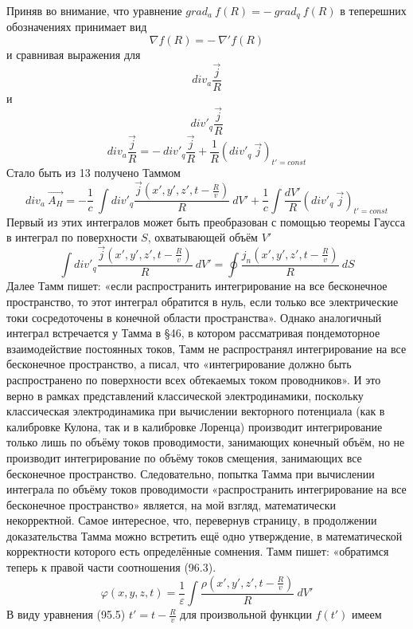 \documentclass[11pt]{article}
\begin{document}
Приняв во внимание, что уравнение
\(gra{{d}_{a}}\ f\left( R \right)=-\ gra{{d}_{q}}\ f\left( R \right)\) в
теперешних обозначениях принимает вид
\[\nabla f\left( R \right)=-\ \nabla 'f\left( R \right)\] и сравнивая
выражения для \[di{{v}_{a}}\frac{\overrightarrow{j}}{R}\] и
\[div{{'}_{q}}\frac{\overrightarrow{j}}{R}\]
\[{{div}_{a}}\frac{\overrightarrow{j}}{R}=-\ div{{'}_{q}}\frac{\overrightarrow{j}}{R}+\frac{1}{R}{{\left( div{{'}_{q}}\ \overrightarrow{j} \right)}_{t'=const}}\]
Стало быть из 13 получено Таммом
\[{{div}_{a}}\ \overrightarrow{{{A}_{H}}}=-\frac{1}{c}\ \int{div{{'}_{q}}\frac{\overrightarrow{j}\left( x',y',z',t-\frac{R}{v} \right)}{R}}\ dV'+\frac{1}{c}\int{\frac{dV'}{R}}{{\left( div{{'}_{q}}\ \overrightarrow{j} \right)}_{t'=const}}\]
Первый из этих интегралов может быть преобразован с помощью теоремы
Гаусса в интеграл по поверхности \(S\), охватывающей объём \(V'\)
\[\int{div{{'}_{q}}\frac{\overrightarrow{j}\left( x',y',z',t-\frac{R}{v} \right)}{R}}\ dV'=\oint{\frac{{{j}_{n}}\left( x',y',z',t-\frac{R}{v} \right)}{R}}\ dS\]
Далее Тамм пишет: «если распространить интегрирование на все бесконечное
пространство, то этот интеграл обратится в нуль, если только все
электрические токи сосредоточены в конечной области пространства».
Однако аналогичный интеграл встречается у Тамма в §46, в котором
рассматривая пондемоторное взаимодействие постоянных токов, Тамм не
распространял интегрирование на все бесконечное пространство, а писал,
что «интегрирование должно быть распространено по поверхности всех
обтекаемых током проводников». И это верно в рамках представлений
классической электродинамики, поскольку классическая электродинамика при
вычислении векторного потенциала (как в калибровке Кулона, так и в
калибровке Лоренца) производит интегрирование только лишь по объёму
токов проводимости, занимающих конечный объём, но не производит
интегрирование по объёму токов смещения, занимающих все бесконечное
пространство. Следовательно, попытка Тамма при вычислении интеграла по
объёму токов проводимости «распространить интегрирование на все
бесконечное пространство» является, на мой взгляд, математически
некорректной. Самое интересное, что, перевернув страницу, в продолжении
доказательства Тамма можно встретить ещё одно утверждение, в
математической корректности которого есть определённые сомнения. Тамм
пишет: «обратимся теперь к правой части соотношения (96.3).
\[\varphi \left( x,y,z,t \right)=\frac{1}{\varepsilon }\int{\frac{\rho \left( x',y',z',t-\frac{R}{v} \right)}{R}}\ dV'\]
В виду уравнения (95.5) \(t'=t-\frac{R}{v}\) для произвольной функции
\(f\left( t' \right)\) имеем
\end{document}
